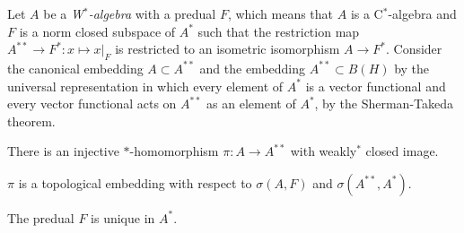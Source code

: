 \documentclass{../../large}
\begin{document}
\begin{prb}
Let $A$ be a \emph{W$^*$-algebra} with a predual $F$, which means that $A$ is a C$^*$-algebra and $F$ is a norm closed subspace of $A^*$ such that the restriction map $A^{**}\to F^*:x\mapsto x|_F$ is restricted to an isometric isomorphism $A\to F^*$.
Consider the canonical embedding $A\subset A^{**}$ and the embedding $A^{**}\subset B(H)$ by the universal representation in which every element of $A^*$ is a vector functional and every vector functional acts on $A^{**}$ as an element of $A^*$, by the Sherman-Takeda theorem.
\begin{parts}
\item There is an injective $*$-homomorphism $\pi:A\to A^{**}$ with weakly$^*$ closed image.
\item $\pi$ is a topological embedding with respect to $\sigma(A,F)$ and $\sigma(A^{**},A^*)$.
\item The predual $F$ is unique in $A^*$.
\end{parts}
\end{prb}
\end{document}
